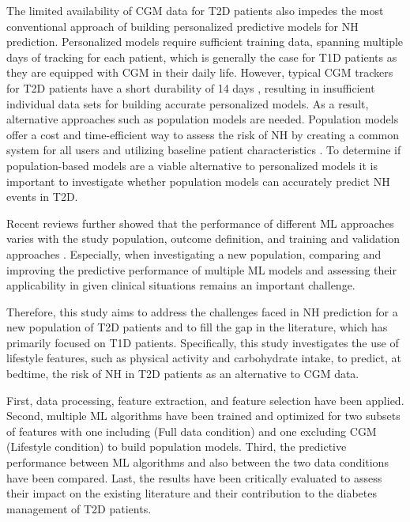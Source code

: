 The limited availability of CGM data for T2D patients also impedes the most conventional approach of building personalized predictive models \cite{bertachi2020prediction,berikov2022machine,guemes2019predicting,mosquera2020predicting} for NH prediction. Personalized models require sufficient training data, spanning multiple days of tracking for each patient, which is generally the case for T1D patients as they are equipped with CGM in their daily life. However, typical CGM trackers for T2D patients have a short durability of 14 days \cite{oyaguez2021cost}, resulting in insufficient individual data sets for building accurate personalized models. As a result, alternative approaches such as population models are needed. Population models offer a cost and time-efficient way to assess the risk of NH by creating a common system for all users and utilizing baseline patient characteristics \cite{parcerisas2022machine}. To determine if population-based models are a viable alternative to personalized models it is important to investigate whether population models can accurately predict NH events in T2D.

Recent reviews \cite{mujahid2021machine,felizardo2021data,zhang2023data} further showed that the performance of different ML approaches varies with the study population, outcome definition, and training and validation approaches \cite{zhang2023data}. Especially, when investigating a new population, comparing and improving the predictive performance of multiple ML models and assessing their applicability in given clinical situations remains an important challenge.

Therefore, this study aims to address the challenges faced in NH prediction for a new population of T2D patients and to fill the gap in the literature, which has primarily focused on T1D patients. Specifically, this study investigates the use of lifestyle features, such as physical activity and carbohydrate intake, to predict, at bedtime, the risk of NH in T2D patients as an alternative to CGM data.

First, data processing, feature extraction, and feature selection have been applied. Second, multiple ML algorithms have been trained and optimized for two subsets of features with one including (Full data condition) and one excluding CGM (Lifestyle condition) to build population models. Third, the predictive performance between ML algorithms and also between the two data conditions have been compared. Last, the results have been critically evaluated to assess their impact on the existing literature and their contribution to the diabetes management of T2D patients.

